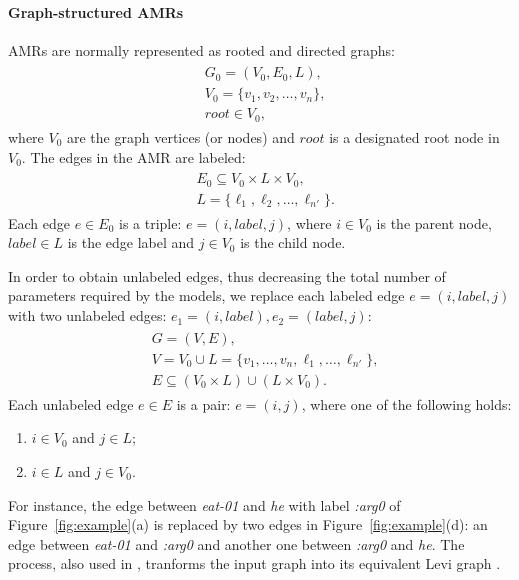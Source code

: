 \documentclass[11pt,a4paper]{article}
\begin{document}
\paragraph{Graph-structured AMRs}
AMRs are normally represented as rooted and directed graphs:
\begin{align*}
\begin{split}
& G_0 = (V_0, E_0, L), \\
& V_0 = \{v_1, v_2, \dots, v_n \},\\ 
& root \in V_0,
\end{split}
\end{align*}
\noindent where $V_0$ are the graph vertices (or nodes) and $root$ is a designated root node in $V_0$. The edges in the AMR are labeled:
\begin{align*}
\begin{split}
& E_0 \subseteq V_0 \times L \times V_0, \\
& L = \{\ell_1, \ell_2, \dots, \ell_{n'} \}.
\end{split}
\end{align*}
Each edge $e \in E_0$ is a triple: $e=(i,label,j)$, where $i \in V_0$ is the parent node, $label \in L$ is the edge label and $j \in V_0$ is the child node.

In order to obtain unlabeled edges, thus decreasing the total number of parameters required by the models, we replace each labeled edge $e = (i, label, j)$ with two unlabeled edges: $e_1 = (i, label), e_2 = (label, j)$:
\begin{align*}
\begin{split}
& G = (V, E), \\
& V = V_0 \cup L = \{v_1, \dots, v_n, \ell_1, \dots, \ell_{n'} \},\\
& E \subseteq (V_0 \times L) \cup (L \times V_0).
\end{split}
\end{align*}
Each unlabeled edge $e \in E$ is a pair: $e=(i,j)$,
where one of the following holds:
\begin{enumerate}
\item $i \in V_0$ and $j \in L$;
\item $i \in L$ and $j \in V_0$.
\end{enumerate}

For instance, the edge between \emph{eat-01} and \emph{he} with label \emph{:arg0} of Figure~\ref{fig:example}(a) is replaced by two edges in Figure~\ref{fig:example}(d): an edge between \emph{eat-01} and \emph{:arg0} and another one between \emph{:arg0} and \emph{he}.
The process, also used in , tranforms the input graph into its equivalent Levi graph \cite{levi1942finite}. 
\end{document}
